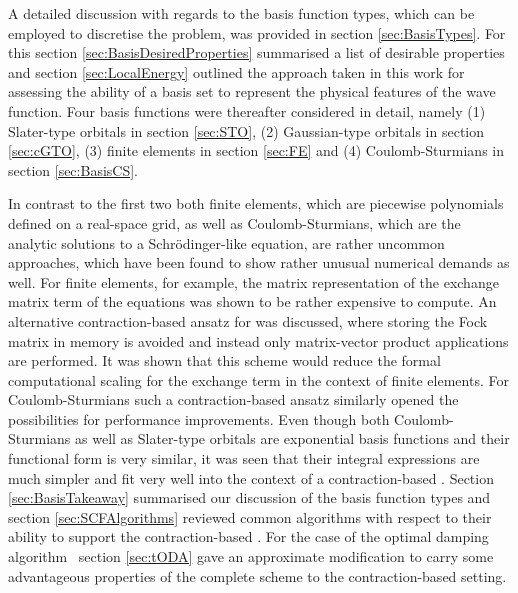 
A detailed discussion with regards to the basis function types,
which can be employed to discretise the \HF problem,
was provided in section \ref{sec:BasisTypes}.
For this section \ref{sec:BasisDesiredProperties}
summarised a list of desirable properties
and section \ref{sec:LocalEnergy}
outlined the approach taken in this work for
assessing the ability of a basis set to represent the physical
features of the wave function.
Four basis functions were thereafter considered in detail,
namely (1) Slater-type orbitals in section \ref{sec:STO},
(2) Gaussian-type orbitals in section \ref{sec:cGTO},
(3) finite elements in section \ref{sec:FE}
and (4) Coulomb-Sturmians in section \ref{sec:BasisCS}.

In contrast to the first two
both finite elements,
which are piecewise polynomials defined on a real-space grid,
as well as Coulomb-Sturmians,
which are the analytic solutions to a Schrödinger-like equation,
are rather uncommon approaches,
which have been found to show rather unusual numerical demands as well.
For finite elements, for example,
the matrix representation of the exchange matrix term of the \HF equations
was shown to be rather expensive to compute.
An alternative contraction-based ansatz for \HF was discussed,
where storing the Fock matrix in memory is avoided
and instead only matrix-vector product applications are performed.
It was shown that this scheme would reduce
the formal computational scaling
for the exchange term in the context of finite elements.
For Coulomb-Sturmians such a contraction-based \SCF
ansatz similarly opened the possibilities for performance improvements.
Even though both Coulomb-Sturmians as well as Slater-type
orbitals are exponential basis functions
and their functional form is very similar,
it was seen that their integral expressions are much simpler
and fit very well into the context of a contraction-based \SCF.
Section \ref{sec:BasisTakeaway} summarised our discussion of the basis
function types and section \ref{sec:SCFAlgorithms}
reviewed common \SCF algorithms
with respect to their ability to support the contraction-based \SCF.
For the case of the optimal damping algorithm~\cite{Cances2000a}
section \ref{sec:tODA} gave an approximate modification
to carry some advantageous
properties of the complete scheme to the contraction-based setting.


